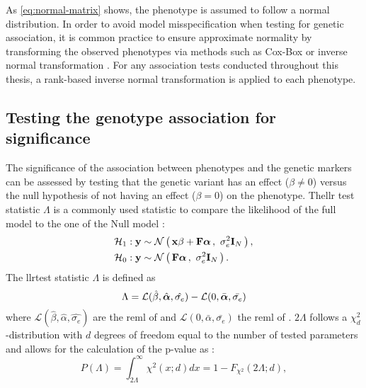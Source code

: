 As \cref{eq:normal-matrix} shows, the phenotype is assumed to follow a normal distribution. In order to avoid model misspecification when testing for genetic association, it is common practice to ensure approximate normality by transforming the observed phenotypes via methods such as Cox-Box \citep{Etzel2003,Yang2006} or inverse normal transformation \citep{Scuteri2007,Guan2008,Anttila2010,Casale2015}. For any association tests conducted throughout this thesis, a rank-based inverse normal transformation is applied to each phenotype.

\subsection{Testing the genotype association for significance}
\label{subsection:hypothesis-testing}
The significance of the association between phenotypes and the genetic markers can be assessed by testing that the genetic variant has an effect (\(\beta \neq 0\)) versus the null hypothesis \tnullH of not having an effect (\(\beta = 0\)) on the phenotype. The\gls{llr} test statistic \(\Lambda\) is a commonly used statistic to compare the likelihood of the full model \taltH to the one of the Null model \tnullH:
%
\begin{align}
\mathcal{H}_1&: \boldsymbol{\mathbf{y}} \sim \mathcal{N}\left(\,{\boldsymbol{\mathbf{x}}\beta + \boldsymbol{\mathbf{F}}\boldsymbol{\mathbf{\alpha}}}\,,~{\sigma_e^2\boldsymbol{\mathbf{I}}_{N}}\,\right),\label{eq:lm_alt} \\
\mathcal{H}_0&: \boldsymbol{\mathbf{y}} \sim \mathcal{N}\left(\,{\boldsymbol{\mathbf{F}}\boldsymbol{\mathbf{\alpha}}}\,,~{\sigma_e^2\boldsymbol{\mathbf{I}}_{N}}\,\right). \label{eq:lm_null}
\end{align}
%
The \gls{llr}test statistic \(\Lambda\) is defined as
\begin{equation}
\Lambda  =  \mathcal{L} (\hat{\beta}, \hat{\boldsymbol{\mathbf{\alpha}}}, \hat{\sigma_{e}}) -  \mathcal{L} (0, \bar{\boldsymbol{\mathbf{\alpha}}}, \bar{\sigma_{e}})
\label{eq:llr}
\end{equation}
%
where \(\mathcal{L} (\hat{\beta}, \hat{\alpha}, \hat{\sigma_{e}})\) are the \gls{reml} of \taltH and \(\mathcal{L} (0, \bar{\alpha}, \bar{\sigma_{e}})\) the \gls{reml} of \tnullH. \(2\Lambda\) follows a \(\chi^2_{d}\)-distribution with \(d\) degrees of freedom equal to the number of tested parameters \citep{Wilks1938} and allows for the calculation of the p-value as :
\begin{equation}
P(\Lambda) = \int_{2\Lambda}^{\infty} \chi^2 \left(x;d\right)dx = 1- F_{\chi^2}\left(2\Lambda; d\right),
\label{eq:pvalue}
\end{equation}

